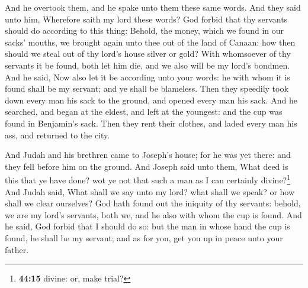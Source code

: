  And he overtook them, and he spake unto them these same
words.  And they said unto him, Wherefore saith my lord
these words? God forbid that thy servants should do according to this
thing:  Behold, the money, which we found in our sacks'
mouths, we brought again unto thee out of the land of Canaan: how then
should we steal out of thy lord's house silver or gold? 
With whomsoever of thy servants it be found, both let him die, and we
also will be my lord's bondmen.  And he said, Now also
let it be according unto your words: he with whom it is found shall be
my servant; and ye shall be blameless.  Then they
speedily took down every man his sack to the ground, and opened every
man his sack.  And he searched, and began at the eldest,
and left at the youngest: and the cup was found in Benjamin's sack.
 Then they rent their clothes, and laded every man his
ass, and returned to the city.

 And Judah and his brethren came to Joseph's house; for
he was yet there: and they fell before him on the ground.
 And Joseph said unto them, What deed is this that ye
have done? wot ye not that such a man as I can certainly
divine?\footnote{\textbf{44:15} divine: or, make trial?} 
And Judah said, What shall we say unto my lord? what shall we speak? or
how shall we clear ourselves? God hath found out the iniquity of thy
servants: behold, we are my lord's servants, both we, and he also with
whom the cup is found.  And he said, God forbid that I
should do so: but the man in whose hand the cup is found, he shall be my
servant; and as for you, get you up in peace unto your father.

